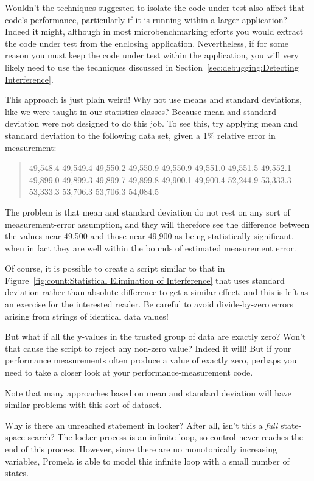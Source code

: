 \begin{enumerate}
\QuickQ{}
	Wouldn't the techniques suggested to isolate the code under
	test also affect that code's performance, particularly if
	it is running within a larger application?
\QuickA{}
	Indeed it might, although in most microbenchmarking efforts
	you would extract the code under test from the enclosing
	application.
	Nevertheless, if for some reason you must keep the code under
	test within the application, you will very likely need to use
	the techniques discussed in
	Section~\ref{sec:debugging:Detecting Interference}.

\QuickQ{}
	This approach is just plain weird!
	Why not use means and standard deviations, like we were taught
	in our statistics classes?
\QuickA{}
	Because mean and standard deviation were not designed to do this job.
	To see this, try applying mean and standard deviation to the
	following data set, given a 1\% relative error in measurement:

	\begin{quote}
		49,548.4 49,549.4 49,550.2 49,550.9 49,550.9 49,551.0
		49,551.5 49,552.1 49,899.0 49,899.3 49,899.7 49,899.8
		49,900.1 49,900.4 52,244.9 53,333.3 53,333.3 53,706.3
		53,706.3 54,084.5
	\end{quote}

	The problem is that mean and standard deviation do not rest on
	any sort of measurement-error assumption, and they will therefore
	see the difference between the values near 49,500 and those near
	49,900 as being statistically significant, when in fact they are
	well within the bounds of estimated measurement error.

	Of course, it is possible to create a script similar to
	that in
	Figure~\ref{fig:count:Statistical Elimination of Interference}
	that uses standard deviation rather than absolute difference
	to get a similar effect,
	and this is left as an exercise for the interested reader.
	Be careful to avoid divide-by-zero errors arising from strings
	of identical data values!

\QuickQ{}
	But what if all the y-values in the trusted group of data
	are exactly zero?
	Won't that cause the script to reject any non-zero value?
\QuickA{}
	Indeed it will!
	But if your performance measurements often produce a value of
	exactly zero, perhaps you need to take a closer look at your
	performance-measurement code.

	Note that many approaches based on mean and standard deviation
	will have similar problems with this sort of dataset.

\QuickQ{}
	Why is there an unreached statement in
	locker?  After all, isn't this a \emph{full} state-space
	search?
\QuickA{}
	The locker process is an infinite loop, so control
	never reaches the end of this process.
	However, since there are no monotonically increasing variables,
	Promela is able to model this infinite loop with a small
	number of states.


\end{enumerate}
